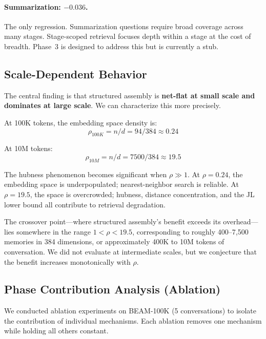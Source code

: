 \documentclass[11pt]{article}
\begin{document}
\paragraph{Summarization: $-0.036$.}
The only regression.  Summarization questions require broad coverage
across many stages.  Stage-scoped retrieval focuses depth within a
stage at the cost of breadth.  Phase~3 is designed to address this
but is currently a stub.

\subsection{Scale-Dependent Behavior}
\label{sec:scale-dependent}

The central finding is that structured assembly is \textbf{net-flat at
small scale and dominates at large scale}.  We can characterize this
more precisely.

At 100K tokens, the embedding space density is:
\begin{equation}
\rho_{100K} = n/d = 94/384 \approx 0.24
\label{eq:rho-100k}
\end{equation}

At 10M tokens:
\begin{equation}
\rho_{10M} = n/d = 7500/384 \approx 19.5
\label{eq:rho-10m}
\end{equation}

The hubness phenomenon \citep{Radovanovic2010} becomes significant
when $\rho \gg 1$.  At $\rho = 0.24$, the embedding space is
underpopulated; nearest-neighbor search is reliable.  At
$\rho = 19.5$, the space is overcrowded; hubness, distance
concentration, and the JL lower bound all contribute to retrieval
degradation.

The crossover point---where structured assembly's benefit exceeds its
overhead---lies somewhere in the range $1 < \rho < 19.5$,
corresponding to roughly 400--7,500 memories in 384 dimensions, or
approximately 400K to 10M tokens of conversation.  We did not evaluate
at intermediate scales, but we conjecture that the benefit increases
monotonically with $\rho$.

\subsection{Phase Contribution Analysis (Ablation)}
\label{sec:ablation}

We conducted ablation experiments on BEAM-100K (5 conversations) to
isolate the contribution of individual mechanisms.  Each ablation
removes one mechanism while holding all others constant.
\end{document}
